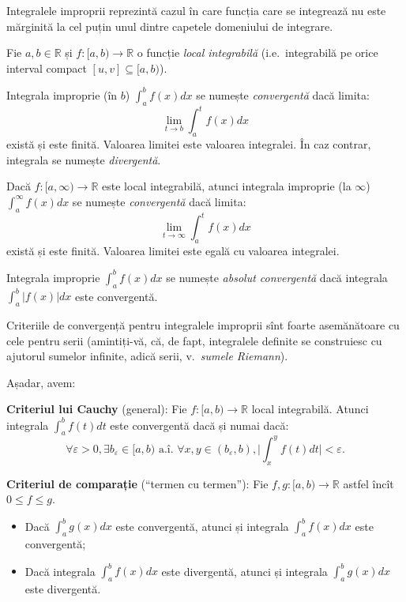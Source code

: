 \documentclass[11pt,a4paper]{article}
\newcommand\qq{\enquote}
\newcommand\ds{\displaystyle}
\newcommand\seq{\subseteq}
\newcommand\ai{\text{ a.\^{i}. }}
\newcommand\RR{\mathbb{R}}
\theoremstyle{dotless}
\theoremstyle{dotlessdr}
\begin{document}
Integralele improprii reprezintă cazul în care funcția care se integrează
nu este mărginită la cel puțin unul dintre capetele domeniului de integrare.

Fie $a, b \in \RR$ și $f : [a, b) \to \RR$ o funcție \emph{local integrabilă}
(i.e.\ integrabilă pe orice interval compact $[u, v] \seq [a, b)$).

Integrala improprie (în $b$) $\ds\int_a^b f(x) dx$ se numește \emph{convergentă}
dacă limita:
\[
  \lim_{t \to b} \int_a^t f(x) dx
\]
există și este finită. Valoarea limitei este valoarea integralei. În caz contrar,
integrala se numește \emph{divergentă}.

Dacă $f : [a, \infty) \to \RR$ este local integrabilă, atunci integrala
improprie (la $\infty$) $\ds\int_a^\infty f(x) dx$ se numește \emph{convergentă}
dacă limita:
\[
  \lim_{t \to \infty} \int_a^t f(x) dx
\]
există și este finită. Valoarea limitei este egală cu valoarea integralei.

Integrala improprie $\ds\int_a^b f(x) dx$ se numește \emph{absolut convergentă}
dacă integrala $\ds\int_a^b |f(x)| dx$ este convergentă.

Criteriile de convergență pentru integralele improprii sînt foarte asemănătoare
cu cele pentru serii (amintiți-vă, că, de fapt, integralele definite se construiesc
cu ajutorul sumelor infinite, adică serii, v.\ \emph{sumele Riemann}).

Așadar, avem:

\textbf{Criteriul lui Cauchy} (general): Fie $f:[a, b) \to \RR$ local integrabilă.
Atunci integrala $\ds\int_a^b f(t) dt$ este convergentă dacă și numai dacă:
\[
  \forall \varepsilon > 0, \exists b_\varepsilon \in [a, b) \ai %
  \forall x, y \in (b_\varepsilon, b), \big| \int_x^y f(t) dt \big| < \varepsilon.
\]

\vspace{1cm}

\textbf{Criteriul de comparație} (\qq{termen cu termen}): Fie $f, g : [a, b) \to \RR$
astfel încît $0 \leq f \leq g$.
\begin{itemize}
\item Dacă $\ds\int_a^b g(x) dx$ este convergentă, atunci și integrala
  $\ds\int_a^b f(x) dx$ este convergentă;
\item Dacă integrala $\ds\int_a^b f(x) dx$ este divergentă, atunci și integrala
  $\ds\int_a^b g(x) dx$ este divergentă.
\end{itemize}

\vspace{1cm}
\end{document}
